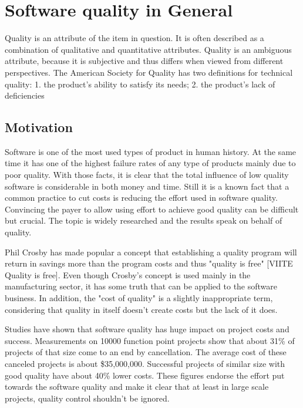 \section{Software quality in General}

Quality is an attribute of the item in question. It is often described as a combination of qualitative and quantitative attributes. Quality is an ambiguous attribute, because it is subjective and thus differs when viewed from different perspectives. The American Society for Quality has two definitions for technical quality: 1. the product's ability to satisfy its needs; 2. the product's lack of deficiencies~\cite{ASQglossary}
 

\subsection{Motivation}

Software is one of the most used types of product in human history. At the same time it has one of the highest failure rates of any type of products mainly due to poor quality. With those facts, it is clear that the total influence of low quality software is considerable in both money and time. Still it is a known fact that a common practice to cut costs is reducing the effort used in software quality. Convincing the payer to allow using effort to achieve good quality can be difficult but crucial. The topic is widely researched and the results speak on behalf of quality.

Phil Crosby has made popular a concept that establishing a quality program will return in savings more than the program costs and thus "quality is free" [VIITE Quality is free]. Even though Crosby's concept is used mainly in the manufacturing sector, it has some truth that can be applied to the software business.  In addition, the "cost of quality" is a slightly inappropriate term, considering that quality in itself doesn't create costs but the lack of it does. 

Studies have shown that software quality has huge impact on project costs and success. Measurements on 10000 function point projects show that about 31\% of projects of that size come to an end by cancellation. The average cost of these canceled projects is about \$35,000,000. Successful projects of similar size with good quality have about 40\% lower costs. These figures endorse the effort put towards the software quality and make it clear that at least in large scale projects, quality control shouldn't be ignored.

